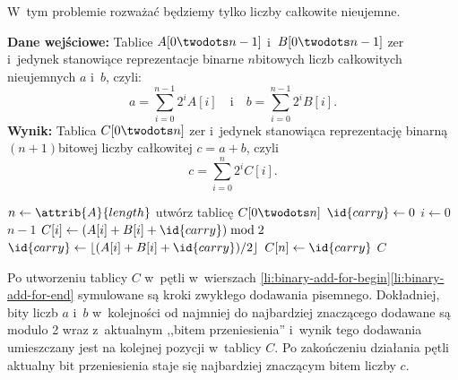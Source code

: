 \exercise %
W~tym problemie rozważać będziemy tylko liczby całkowite nieujemne.

\bigskip
\noindent\textbf{Dane wejściowe:} Tablice $A[0\twodots n-1]$ i~$B[0\twodots n-1]$ zer i~jedynek stanowiące reprezentacje binarne $n$\nbhyphen bitowych liczb całkowitych nieujemnych $a$ i~$b$, czyli:
\[
	a = \sum_{i=0}^{n-1}2^iA[i] \quad\text{i}\quad b = \sum_{i=0}^{n-1}2^iB[i].
\]
\textbf{Wynik:} Tablica $C[0\twodots n]$ zer i~jedynek stanowiąca reprezentację binarną $(n+1)$\nbhyphen bitowej liczby całkowitej $c=a+b$, czyli
\[
	c = \sum_{i=0}^n2^iC[i].
\]

\begin{codebox}
\li	$n\gets\attrib{A}{length}$
\li	utwórz tablicę $C[0\twodots n]$
\li	$\id{carry}\gets0$
\li	\For $i\gets0$ \To $n-1$ \label{li:binary-add-for-begin}
\li		\Do $C[i]\gets(A[i]+B[i]+\id{carry})\bmod2$
\li			$\id{carry}\gets\lfloor(A[i]+B[i]+\id{carry})/2\rfloor$
		\End \label{li:binary-add-for-end}
\li	$C[n]\gets\id{carry}$
\li	\Return $C$
\end{codebox}

Po utworzeniu tablicy $C$ w~pętli  w~wierszach \ref{li:binary-add-for-begin}\nbendash\ref{li:binary-add-for-end} symulowane są kroki zwykłego dodawania pisemnego.
Dokładniej, bity liczb $a$ i~$b$ w~kolejności od najmniej do najbardziej znaczącego dodawane są modulo 2 wraz z~aktualnym ,,bitem przeniesienia'' i~wynik tego dodawania umieszczany jest na kolejnej pozycji w~tablicy $C$.
Po zakończeniu działania pętli aktualny bit przeniesienia staje się najbardziej znaczącym bitem liczby $c$.
